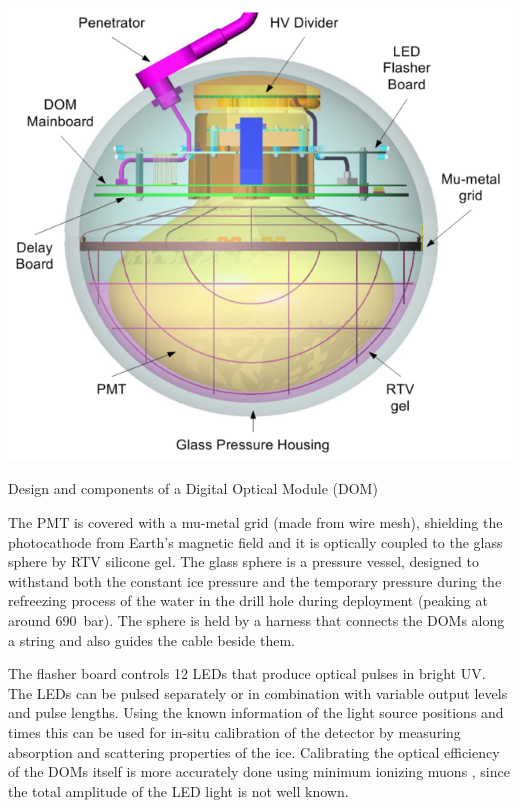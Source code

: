 \begin{marginfigure}
    \includegraphics{figures/icecube_deepcore/DOM_schematic.png}
	\caption[Digital Optical Module (DOM)]{Design and components of a Digital Optical Module (DOM) \cite{ABBASI2009294_data_acquisition}}
\end{marginfigure}

The PMT is covered with a mu-metal grid (made from wire mesh), shielding the photocathode from Earth's magnetic field and it is optically coupled to the glass sphere by RTV silicone gel. The glass sphere is a pressure vessel, designed to withstand both the constant ice pressure and the temporary pressure during the refreezing process of the water in the drill hole during deployment (peaking at around \SI{690}{\bar}). The sphere is held by a harness that connects the DOMs along a string and also guides the cable beside them.

The flasher board controls 12 LEDs that produce optical pulses in bright UV. The LEDs can be pulsed separately or in combination with variable output levels and pulse lengths. Using the known information of the light source positions and times this can be used for in-situ calibration of the detector by measuring absorption and scattering properties of the ice. Calibrating the optical efficiency of the DOMs itself is more accurately done using minimum ionizing muons , since the total amplitude of the LED light is not well known.


